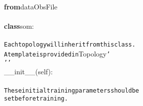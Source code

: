 {{\begin{tabbing}
{\textbf{from}}\hspace{6pt}data\hspace{6pt}ObsFile\\
\\
{\textbf{class}}\hspace{6pt}som:\\
\\
{\texttt{\hspace{48pt}Each\hspace{6pt}topology\hspace{6pt}will\hspace{6pt}inherit\hspace{6pt}from\hspace{6pt}this\hspace{6pt}class.}}\\
{\texttt{\hspace{48pt}A\hspace{6pt}template\hspace{6pt}is\hspace{6pt}provided\hspace{6pt}in\hspace{6pt}{'}}}Topology{\texttt{{'}}}\\
{\texttt{\hspace{24pt}{'}}}{\texttt{{'}{'}}}\\
\hspace{6pt}\_\_init\_\_(self):\\
\\
{\texttt{\hspace{48pt}These\hspace{6pt}initial\hspace{6pt}training\hspace{6pt}parameters\hspace{6pt}should\hspace{6pt}be}}\\
{\texttt{\hspace{48pt}set\hspace{6pt}before\hspace{6pt}training.}}\\

\end{tabbing}}}
